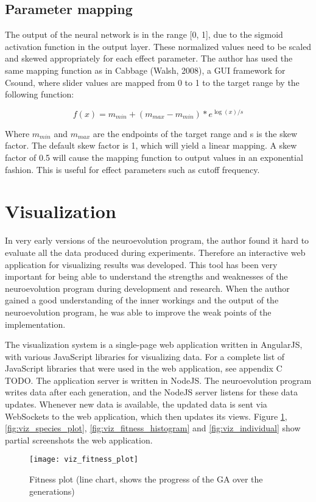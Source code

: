 \subsection{Parameter mapping}
The output of the neural network is in the range [0, 1], due to the sigmoid activation function in the output layer. These normalized values need to be scaled and skewed appropriately for each effect parameter. The author has used the same mapping function as in Cabbage (Walsh, 2008), a GUI framework for Csound, where slider values are mapped from 0 to 1 to the target range by the following function:

$$f(x)=m_{min}+(m_{max}-m_{min})*e^{\log(x)/s}$$

Where $m_{min}$ and $m_{max}$ are the endpoints of the target range and s is the skew factor. The default skew factor is 1, which will yield a linear mapping. A skew factor of 0.5 will cause the mapping function to output values in an exponential fashion. This is useful for effect parameters such as cutoff frequency.

\section{Visualization}
In very early versions of the neuroevolution program, the author found it hard to evaluate all the data produced during experiments. Therefore an interactive web application for visualizing results was developed. This tool has been very important for being able to understand the strengths and weaknesses of the neuroevolution program during development and research. When the author gained a good understanding of the inner workings and the output of the neuroevolution program, he was able to improve the weak points of the implementation.

The visualization system is a single-page web application written in AngularJS, with various JavaScript libraries for visualizing data. For a complete list of JavaScript libraries that were used in the web application, see appendix C TODO. The application server is written in NodeJS. The neuroevolution program writes data after each generation, and the NodeJS server listens for these data updates. Whenever new data is available, the updated data is sent via WebSockets to the web application, which then updates its views. Figure \ref{fig:viz_fitness_plot}, \ref{fig:viz_species_plot}, \ref{fig:viz_fitness_histogram} and \ref{fig:viz_individual} show partial screenshots the web application.

\begin{figure}[h]
    \centering
    \texttt{[image: viz\_fitness\_plot]}
    \caption{Fitness plot (line chart, shows the progress of the GA over the generations)}
    \label{fig:viz_fitness_plot}
\end{figure}

